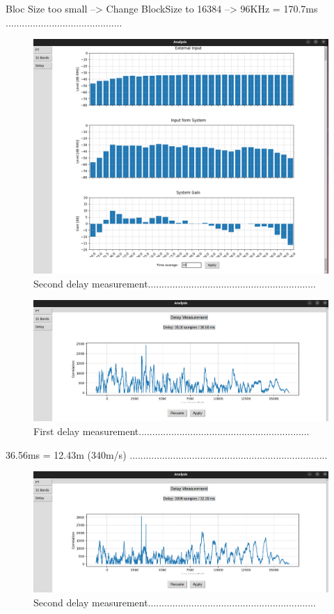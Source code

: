 Bloc Size too small --> Change BlockSize to 16384 --> 96KHz = 170.7ms ...........................................

\begin{figure}[H]
	\centering
	\includegraphics[width=0.6
	\linewidth]{Figures/Coro_Pink_Good.png}
	\caption{Second delay measurement..............................................................}
	\label{fig:Coro_Good_Pink}
\end{figure}

\begin{figure}[H]
	\centering
	\includegraphics[width=0.6
	\linewidth]{Figures/Coro_Delay.png}
	\caption{First delay measurement...............................................................}
	\label{fig:Coro_delay1}
\end{figure}

36.56ms = 12.43m (340m/s) .........................................................................

\begin{figure}[H]
	\centering
	\includegraphics[width=0.6
	\linewidth]{Figures/Coro_delay_2.png}
	\caption{Second delay measurement..............................................................}
	\label{fig:Coro_delay2}
\end{figure}

